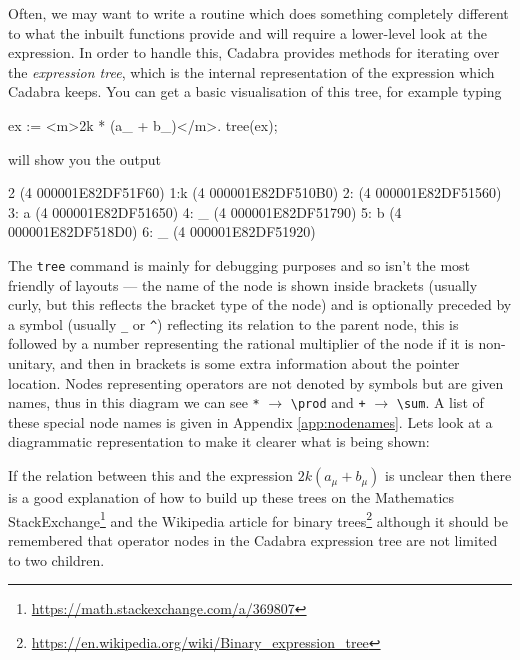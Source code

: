 \documentclass{article}
\begin{document}
Often, we may want to write a routine which does something completely different to what the inbuilt functions
provide and will require a lower-level look at the expression. In order to handle this, Cadabra provides methods
for iterating over the \emph{expression tree}, which is the internal representation of the expression which
Cadabra keeps. You can get a basic visualisation of this tree, for example typing
\begin{lstcdb}
	ex := <m>2k * (a_{\mu} + b_{\mu})</m>.
	tree(ex);
\end{lstcdb}
will show you the output
\begin{lstverb}
	{\prod}  2  (4 000001E82DF51F60)
	  1:{k}  (4 000001E82DF510B0)
	  2:{\sum}  (4 000001E82DF51560)
	  3:  {a}  (4 000001E82DF51650)
	  4:    _{\mu}  (4 000001E82DF51790)
	  5:  {b}  (4 000001E82DF518D0)
	  6:    _{\mu}  (4 000001E82DF51920)
\end{lstverb}
The \texttt{tree} command is mainly for debugging purposes and so isn't the most friendly of layouts --- the
name of the node is shown inside brackets (usually curly, but this reflects the bracket type of the node) and
is optionally preceded by a symbol (usually \verb|_| or \verb|^|) reflecting its relation to the parent node,
this is followed by a number representing the rational multiplier of the node if it is non-unitary, and then
in brackets is some extra information about the pointer location. Nodes representing operators are not denoted
by symbols but are given names, thus in this diagram we can see \texttt{*} $\rightarrow$ \verb|\prod| and
\texttt{+} $\rightarrow$ \verb|\sum|. A list of these special node names is given in Appendix \ref{app:nodenames}.
Lets look at a diagrammatic representation to make it clearer what is being shown:

\begin{figure}[H]
	\centering
\end{figure}

If the relation between this and the expression $2k(a_{\mu} + b_{\mu})$ is unclear then there is a good
explanation of how to build up these trees on the Mathematics StackExchange\footnote{
\url{https://math.stackexchange.com/a/369807}} and the Wikipedia article for binary trees\footnote{
\url{https://en.wikipedia.org/wiki/Binary_expression_tree}} although it should be remembered that operator nodes
in the Cadabra expression tree are not limited to two children.
\end{document}
